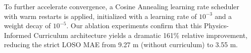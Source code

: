 To further accelerate convergence, a Cosine Annealing learning rate scheduler with warm restarts \cite{loshchilov2016sgdr} is applied, initialized with a learning rate of $10^{-3}$ and a weight decay of $10^{-5}$. Our ablation experiments confirm that this Physics-Informed Curriculum architecture yields a dramatic 161\% relative improvement, reducing the strict LOSO MAE from 9.27 m (without curriculum) to 3.55 m.



